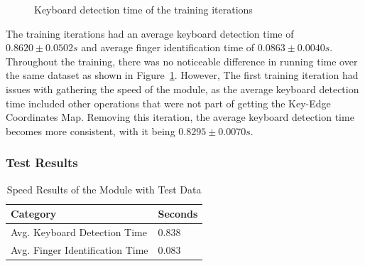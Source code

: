 \documentclass{report}
\begin{document}
\begin{figure}[H]
	\centering
	\caption{Keyboard detection time of the training iterations}
	\label{fig:rd-training-keyboard-detection-time}
\end{figure}

The training iterations had an average keyboard detection time of
$0.8620\pm0.0502s$ and average finger identification time of $0.0863\pm0.0040s$.
Throughout the training, there was no noticeable difference in running time over
the same dataset as shown in
Figure~\ref{fig:rd-training-keyboard-detection-time}. However, The first
training iteration had issues with gathering the speed of the module, as the
average keyboard detection time included other operations that were not part of
getting the Key-Edge Coordinates Map. Removing this iteration, the average
keyboard detection time becomes more consistent, with it being
$0.8295\pm0.0070s$.

\subsubsection{Test Results}

\begin{table}[H]
	\small
	\centering
	\begin{tabular}{ p{} R{0.2\textwidth} }
		\toprule
		Category                        & Seconds \\
		\midrule
		Avg. Keyboard Detection Time    & 0.838   \\
		Avg. Finger Identification Time & 0.083   \\
		\bottomrule
	\end{tabular}
	\caption{\label{tab:rd-speed}Speed Results of the Module with Test Data}
\end{table}
\end{document}
